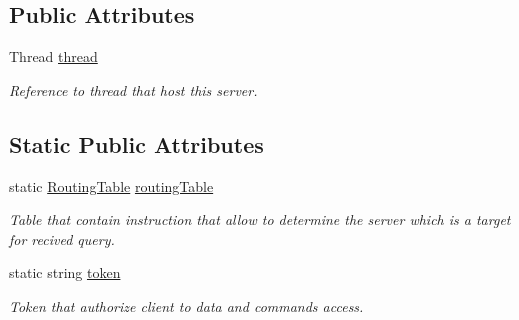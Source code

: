 \subsection*{Public Attributes}
\begin{DoxyCompactItemize}
\item 
Thread \mbox{\hyperlink{class_uniform_client_1_1_base_client_a458271823ca5e21612c0947e1db695a0}{thread}}
\begin{DoxyCompactList}\small\item\em Reference to thread that host this server. \end{DoxyCompactList}\end{DoxyCompactItemize}
\subsection*{Static Public Attributes}
\begin{DoxyCompactItemize}
\item 
static \mbox{\hyperlink{class_pipes_provider_1_1_networking_1_1_routing_1_1_routing_table}{Routing\+Table}} \mbox{\hyperlink{class_uniform_client_1_1_base_client_a33b34ea9a2d7b4b8e26af767ab2897cf}{routing\+Table}}
\begin{DoxyCompactList}\small\item\em Table that contain instruction that allow to determine the server which is a target for recived query. \end{DoxyCompactList}\item 
static string \mbox{\hyperlink{class_uniform_client_1_1_base_client_ad99bcf3d1afeed6eadca7035c926d2b7}{token}}
\begin{DoxyCompactList}\small\item\em Token that authorize client to data and commands access. \end{DoxyCompactList}\end{DoxyCompactItemize}
